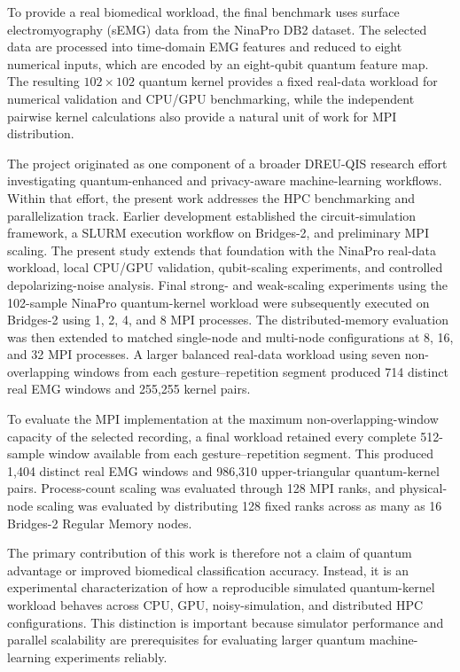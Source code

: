 \documentclass[pdflatex,sn-mathphys-num]{sn-jnl}%
\theoremstyle{thmstyleone}%
\theoremstyle{thmstyletwo}%
\theoremstyle{thmstylethree}%
\begin{document}
To provide a real biomedical workload, the final benchmark uses surface
electromyography (sEMG) data from the NinaPro DB2 dataset. The selected data are
processed into time-domain EMG features and reduced to eight numerical inputs,
which are encoded by an eight-qubit quantum feature map. The resulting
$102\times102$ quantum kernel provides a fixed real-data workload for numerical
validation and CPU/GPU benchmarking, while the independent pairwise kernel
calculations also provide a natural unit of work for MPI distribution.

The project originated as one component of a broader DREU-QIS research effort
investigating quantum-enhanced and privacy-aware machine-learning workflows.
Within that effort, the present work addresses the HPC benchmarking and
parallelization track. Earlier development established the circuit-simulation
framework, a SLURM execution workflow on Bridges-2, and preliminary MPI scaling.
The present study extends that foundation with the NinaPro real-data workload,
local CPU/GPU validation, qubit-scaling experiments, and controlled
depolarizing-noise analysis. Final strong- and weak-scaling experiments using the 102-sample NinaPro
quantum-kernel workload were subsequently executed on Bridges-2 using
1, 2, 4, and 8 MPI processes. The distributed-memory evaluation was then
extended to matched single-node and multi-node configurations at 8, 16,
and 32 MPI processes. A larger balanced real-data workload using seven
non-overlapping windows from each gesture--repetition segment produced
714 distinct real EMG windows and 255,255 kernel pairs.

To evaluate the MPI implementation at the maximum non-overlapping-window
capacity of the selected recording, a final workload retained every complete
512-sample window available from each gesture--repetition segment. This
produced 1,404 distinct real EMG windows and 986,310 upper-triangular
quantum-kernel pairs. Process-count scaling was evaluated through 128 MPI
ranks, and physical-node scaling was evaluated by distributing 128 fixed
ranks across as many as 16 Bridges-2 Regular Memory nodes.

The primary contribution of this work is therefore not a claim of quantum
advantage or improved biomedical classification accuracy. Instead, it is an
experimental characterization of how a reproducible simulated quantum-kernel
workload behaves across CPU, GPU, noisy-simulation, and distributed HPC
configurations. This distinction is important because simulator performance and
parallel scalability are prerequisites for evaluating larger quantum
machine-learning experiments reliably.
\end{document}
